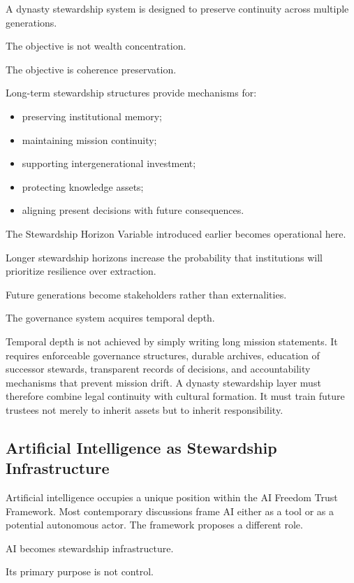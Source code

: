 \documentclass[12pt]{article}
\begin{document}
A dynasty stewardship system is designed to preserve continuity across multiple generations.

The objective is not wealth concentration.

The objective is coherence preservation.

Long-term stewardship structures provide mechanisms for:

\begin{itemize}
  \item preserving institutional memory;
  \item maintaining mission continuity;
  \item supporting intergenerational investment;
  \item protecting knowledge assets;
  \item aligning present decisions with future consequences.
\end{itemize}

The Stewardship Horizon Variable introduced earlier becomes operational here.

Longer stewardship horizons increase the probability that institutions will prioritize resilience over extraction.

Future generations become stakeholders rather than externalities.

The governance system acquires temporal depth.

Temporal depth is not achieved by simply writing long mission statements. It requires enforceable governance structures, durable archives, education of successor stewards, transparent records of decisions, and accountability mechanisms that prevent mission drift. A dynasty stewardship layer must therefore combine legal continuity with cultural formation. It must train future trustees not merely to inherit assets but to inherit responsibility.

\subsection{Artificial Intelligence as Stewardship Infrastructure}

Artificial intelligence occupies a unique position within the AI Freedom Trust Framework. Most contemporary discussions frame AI either as a tool or as a potential autonomous actor. The framework proposes a different role.

AI becomes stewardship infrastructure.

Its primary purpose is not control.
\end{document}
